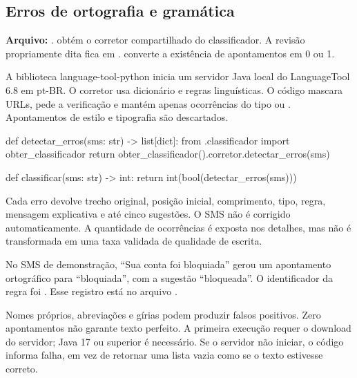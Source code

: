 \clearpage
\subsection{Erros de ortografia e gramática}
\textbf{Arquivo:} .  obtém o corretor compartilhado do classificador. A revisão propriamente dita fica em .  converte a existência de apontamentos em 0 ou 1.

A biblioteca language-tool-python inicia um servidor Java local do LanguageTool 6.8 em pt-BR. O corretor usa dicionário e regras linguísticas. O código mascara URLs, pede a verificação e mantém apenas ocorrências do tipo  ou . Apontamentos de estilo e tipografia são descartados.

\begin{codigofonte}
def detectar_erros(sms: str) -> list[dict]:
    from .classificador import obter_classificador
    return obter_classificador().corretor.detectar_erros(sms)

def classificar(sms: str) -> int:
    return int(bool(detectar_erros(sms)))
\end{codigofonte}

Cada erro devolve trecho original, posição inicial, comprimento, tipo, regra, mensagem explicativa e até cinco sugestões. O SMS não é corrigido automaticamente. A quantidade de ocorrências é exposta nos detalhes, mas não é transformada em uma taxa validada de qualidade de escrita.

\begin{caixainfo}
No SMS de demonstração, ``Sua conta foi bloquiada'' gerou um apontamento ortográfico para ``bloquiada'', com a sugestão ``bloqueada''. O identificador da regra foi . Esse registro está no arquivo .
\end{caixainfo}

\begin{caixaatencao}
Nomes próprios, abreviações e gírias podem produzir falsos positivos. Zero apontamentos não garante texto perfeito. A primeira execução requer o download do servidor; Java 17 ou superior é necessário. Se o servidor não iniciar, o código informa falha, em vez de retornar uma lista vazia como se o texto estivesse correto.
\end{caixaatencao}
